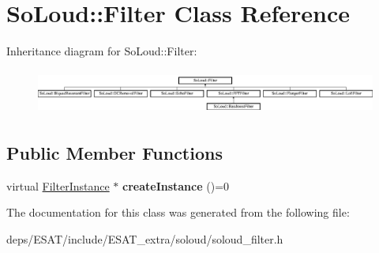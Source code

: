 \hypertarget{class_so_loud_1_1_filter}{}\section{So\+Loud\+:\+:Filter Class Reference}
\label{class_so_loud_1_1_filter}
Inheritance diagram for So\+Loud\+:\+:Filter\+:\begin{figure}[H]
\begin{center}
\leavevmode
\includegraphics[height=1.489362cm]{class_so_loud_1_1_filter}
\end{center}
\end{figure}
\subsection*{Public Member Functions}
\begin{DoxyCompactItemize}
\item 
\mbox{\label{class_so_loud_1_1_filter_ad1a2997835abacc79f5780dd42830583}} 
virtual \mbox{\hyperlink{class_so_loud_1_1_filter_instance}{Filter\+Instance}} $\ast$ {\bfseries create\+Instance} ()=0
\end{DoxyCompactItemize}


The documentation for this class was generated from the following file\+:\begin{DoxyCompactItemize}
\item 
deps/\+E\+S\+A\+T/include/\+E\+S\+A\+T\+\_\+extra/soloud/soloud\+\_\+filter.\+h\end{DoxyCompactItemize}
